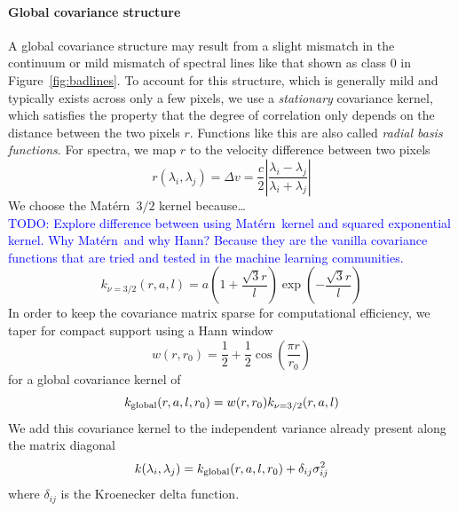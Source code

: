 \documentclass[iop,floatfix]{emulateapj}
\newcommand{\matern}{Mat\'{e}rn}
\newcommand{\todo}[1]{ \textcolor{Blue}{\\TODO: #1}}
\begin{document}
\paragraph{Global covariance structure}
A global covariance structure may result from a slight mismatch in the
 continuum or mild mismatch of spectral lines like that shown as class 0 in
 Figure~\ref{fig:badlines}. 
To account for this structure, which is generally mild and typically exists
 across only a few pixels, we use a \emph{stationary} covariance kernel, which
 satisfies the property that the degree of correlation only depends on the
 distance between the two pixels $r$. 
Functions like this are also called \emph{radial basis functions}. 
For spectra, we map $r$ to the velocity difference between two pixels
\begin{equation}
  r(\lambda_i, \lambda_j) = \Delta v = \frac{c}{2} \left | \frac{\lambda_i - \lambda_j}{ \lambda_i + \lambda_j} \right |
\end{equation}
We choose the \matern\ $3/2$ kernel because\ldots
\todo{Explore difference between using \matern\ kernel and squared exponential
 kernel. 
Why \matern\ and why Hann? 
Because they are the vanilla covariance functions that are tried and tested in
 the machine learning communities.}
\begin{equation}
  k_{\nu = 3/2}(r, a, l) = a \left(1 + \frac{\sqrt{3} r}{l} \right ) \exp \left (- \frac{\sqrt{3} r}{l} \right )
\end{equation}
In order to keep the covariance matrix sparse for computational efficiency, we
 taper for compact support using a Hann window
\begin{equation}
  w(r, r_0) = \frac{1}{2} + \frac{1}{2} \cos \left( \frac{\pi r}{r_0} \right) 
\end{equation}
for a global covariance kernel of 
\begin{equation}
  k_{\rm global} (r, a, l, r_0) = w(r, r_0) k_{\nu = 3/2}(r, a, l) 
  \label{eqn:global}
\end{equation}
We add this covariance kernel to the independent variance already present along
 the matrix diagonal
\begin{equation}
  k(\lambda_i, \lambda_j) = k_{\rm global}(r, a, l, r_0) + \delta_{ij} \sigma_{ij}^2
\end{equation}
where $\delta_{ij}$ is the Kroenecker delta function.
\end{document}
